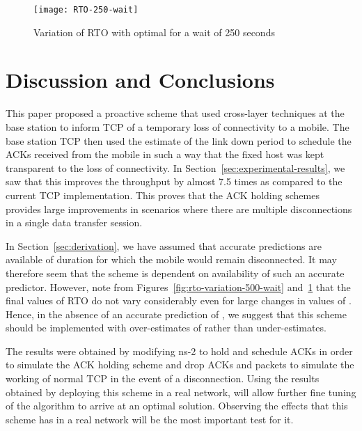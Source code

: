 \documentclass[conference]{IEEEtran}
\begin{document}
\begin{figure}
  \centering
  \texttt{[image: RTO-250-wait]}
  \caption{Variation of RTO with optimal  for a wait of 250 seconds}
  \label{fig:rto-variation-250-wait}
\end{figure}

\section{Discussion and Conclusions}
\label{sec:disc-concl}
This paper proposed a proactive scheme that used cross-layer techniques at the base station to inform TCP of a temporary loss of connectivity to a mobile. The base station TCP then used the estimate of the link down period to schedule the ACKs received from the mobile in such a way that the fixed host was kept transparent to the loss of connectivity. In Section~\ref{sec:experimental-results}, we saw that this improves the throughput by almost 7.5 times as compared to the current TCP implementation. This proves that the ACK holding schemes provides large improvements in scenarios where there are multiple disconnections in a single data transfer session. 



In Section~\ref{sec:derivation}, we have assumed that accurate predictions are available of duration for which the mobile would remain disconnected. It may therefore seem that the scheme is dependent on availability of such an accurate predictor. However, note from Figures~\ref{fig:rto-variation-500-wait} and~\ref{fig:rto-variation-250-wait} that the final values of RTO do not vary considerably even for large changes in values of . Hence, in the absence of an accurate prediction of , we suggest that this scheme should be implemented with over-estimates of  rather than under-estimates.

The results were obtained by modifying ns-2 to hold and schedule ACKs in order to simulate the ACK holding scheme and drop ACKs and packets to simulate the working of normal TCP in the event of a disconnection. Using the results obtained by deploying this scheme in a real network, will allow further fine tuning of the algorithm to arrive at an optimal solution. Observing the effects that this scheme has in a real network will be the most important test for it. 



\end{document}

